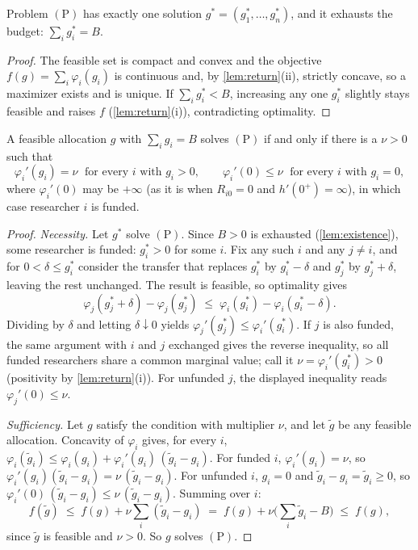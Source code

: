 \begin{lemma}\label{lem:existence}
Problem $(\mathrm{P})$ has exactly one solution $g^* = (g_1^*, \ldots, g_n^*)$, and it exhausts the budget: $\sum_i g_i^* = B$.
\end{lemma}
\begin{proof}
The feasible set is compact and convex and the objective $f(g) = \sum_i \varphi_i(g_i)$ is continuous and, by \cref{lem:return}(ii), strictly concave, so a maximizer exists and is unique. If $\sum_i g_i^* < B$, increasing any one $g_i^*$ slightly stays feasible and raises $f$ (\cref{lem:return}(i)), contradicting optimality.
\end{proof}
\begin{lemma}\label{lem:emv}
A feasible allocation $g$ with $\sum_i g_i = B$ solves $(\mathrm{P})$ if and only if there is a $\nu > 0$ such that
\[
\varphi_i'(g_i) = \nu \;\text{ for every } i \text{ with } g_i > 0, \qquad \varphi_i'(0) \leq \nu \;\text{ for every } i \text{ with } g_i = 0,
\]
where $\varphi_i'(0)$ may be $+\infty$ (as it is when $R_{i0} = 0$ and $h'(0^+) = \infty$), in which case researcher $i$ is funded.
\end{lemma}

\begin{proof}
\emph{Necessity.} Let $g^*$ solve $(\mathrm{P})$. Since $B > 0$ is exhausted (\cref{lem:existence}), some researcher is funded: $g_i^* > 0$ for some $i$. Fix any such $i$ and any $j \neq i$, and for $0 < \delta \leq g_i^*$ consider the transfer that replaces $g_i^*$ by $g_i^* - \delta$ and $g_j^*$ by $g_j^* + \delta$, leaving the rest unchanged. The result is feasible, so optimality gives
\[
\varphi_j(g_j^* + \delta) - \varphi_j(g_j^*) \;\leq\; \varphi_i(g_i^*) - \varphi_i(g_i^* - \delta).
\]
Dividing by $\delta$ and letting $\delta \downarrow 0$ yields $\varphi_j'(g_j^*) \leq \varphi_i'(g_i^*)$. If $j$ is also funded, the same argument with $i$ and $j$ exchanged gives the reverse inequality, so all funded researchers share a common marginal value; call it $\nu = \varphi_i'(g_i^*) > 0$ (positivity by \cref{lem:return}(i)). For unfunded $j$, the displayed inequality reads $\varphi_j'(0) \leq \nu$.

\emph{Sufficiency.} Let $g$ satisfy the condition with multiplier $\nu$, and let $\tilde g$ be any feasible allocation. Concavity of $\varphi_i$ gives, for every $i$, $\varphi_i(\tilde g_i) \leq \varphi_i(g_i) + \varphi_i'(g_i)\,(\tilde g_i - g_i)$. For funded $i$, $\varphi_i'(g_i) = \nu$, so $\varphi_i'(g_i)(\tilde g_i - g_i) = \nu\,(\tilde g_i - g_i)$. For unfunded $i$, $g_i = 0$ and $\tilde g_i - g_i = \tilde g_i \geq 0$, so $\varphi_i'(0)\,(\tilde g_i - g_i) \leq \nu\,(\tilde g_i - g_i)$. Summing over $i$:
\[
f(\tilde g) \;\leq\; f(g) + \nu \sum_i (\tilde g_i - g_i) \;=\; f(g) + \nu\Big(\sum_i \tilde g_i - B\Big) \;\leq\; f(g),
\]
since $\tilde g$ is feasible and $\nu > 0$. So $g$ solves $(\mathrm{P})$.
\end{proof}

